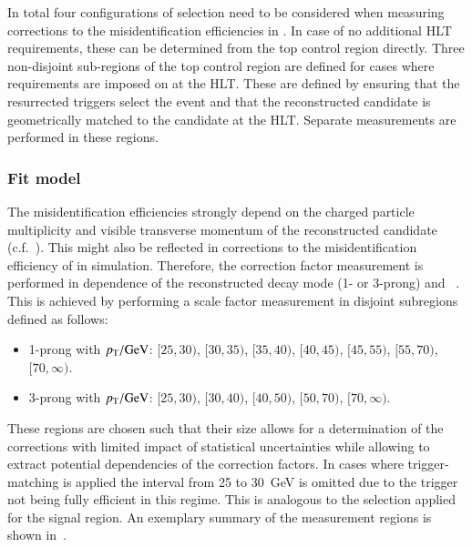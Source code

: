In total four configurations of \tauhadvis selection need to be
considered when measuring corrections to the \tauhadvis
misidentification efficiencies in \ttbar. In case of no additional HLT
requirements, these can be determined from the top control region
directly. Three non-disjoint sub-regions of the top control region are
defined for cases where requirements are imposed on \tauhadvis at the
HLT. These are defined by ensuring that the resurrected triggers
select the event and that the reconstructed \tauhadvis candidate is
geometrically matched to the \tauhadvis candidate at the HLT. Separate
measurements are performed in these regions.



\subsubsection{Fit model}

The \tauhadvis misidentification efficiencies strongly depend on the
charged particle multiplicity and visible transverse momentum of the
reconstructed \tauhadvis candidate (c.f.\ ). This
might also be reflected in corrections to the misidentification
efficiency of \tauhadvis in simulation. Therefore, the correction
factor measurement is performed in dependence of the reconstructed
decay mode (1- or 3-prong) and \tauhadvis~\pT. This is achieved by
performing a scale factor measurement in disjoint subregions defined
as follows:
\begin{itemize}

\item 1-prong \tauhadvis with $\pT / \si{\GeV}$: $[25, 30)$, $[30, 35)$,
  $[35, 40)$, $[40, 45)$, $[45, 55)$, $[55, 70)$, $[70, \infty)$.

\item 3-prong \tauhadvis with $\pT / \si{\GeV}$: $[25, 30)$, $[30, 40)$,
  $[40, 50)$, $[50, 70)$, $[70, \infty)$.

\end{itemize}
These regions are chosen such that their size allows for a
determination of the corrections with limited impact of statistical
uncertainties while allowing to extract potential \pT dependencies of
the correction factors. In cases where trigger-matching is applied the
\tauhadvis \pT interval from 25 to \SI{30}{\GeV} is omitted due to the
trigger not being fully efficient in this regime. This is analogous to
the selection applied for the \hadhad signal region. An exemplary
summary of the measurement regions is shown
in~.

